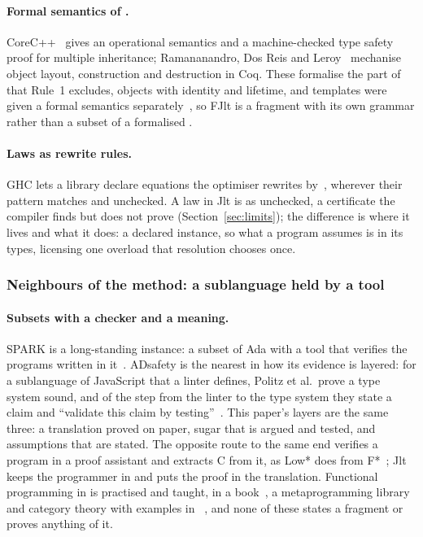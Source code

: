 \paragraph{Formal semantics of \Cpp{}.}
CoreC++~\cite{wasserrab2006operational} gives an operational semantics and a machine-checked type safety proof for multiple inheritance; Ramananandro, Dos Reis and Leroy~\cite{ramananandro2011layout,ramananandro2012construction} mechanise object layout, construction and destruction in Coq.
These formalise the part of \Cpp{} that Rule~1 excludes, objects with identity and lifetime, and templates were given a formal semantics separately~\cite{siek2006templates}, so FJlt is a fragment with its own grammar rather than a subset of a formalised \Cpp{}.



\paragraph{Laws as rewrite rules.}
GHC lets a library declare equations the optimiser rewrites by~\cite{peytonjones2001rules}, wherever their pattern matches and unchecked.
A law in Jlt is as unchecked, a certificate the compiler finds but does not prove (Section~\ref{sec:limits}); the difference is where it lives and what it does: a declared instance, so what a program assumes is in its types, licensing one overload that resolution chooses once.

\subsubsection*{Neighbours of the method: a sublanguage held by a tool}

\paragraph{Subsets with a checker and a meaning.}
SPARK is a long-standing instance: a subset of Ada with a tool that verifies the programs written in it~\cite{hoang2015spark}.
ADsafety is the nearest in how its evidence is layered: for a sublanguage of JavaScript that a linter defines, Politz et al.\ prove a type system sound, and of the step from the linter to the type system they state a claim and ``validate this claim by testing''~\cite{politz2011adsafety}.
This paper's layers are the same three: a translation proved on paper, sugar that is argued and tested, and assumptions that are stated.
The opposite route to the same end verifies a program in a proof assistant and extracts C from it, as Low* does from F*~\cite{protzenko2017verified}; Jlt keeps the programmer in \Cpp{} and puts the proof in the translation.
Functional programming in \Cpp{} is practised and taught, in a book~\cite{cukic2018functional}, a metaprogramming library~\cite{chagnon2016hana} and category theory with examples in \Cpp{}~\cite{milewski2019category}, and none of these states a fragment or proves anything of it.


